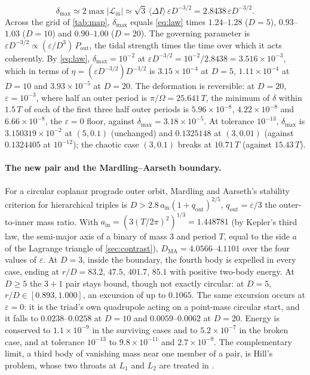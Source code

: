 \documentclass[11pt]{article}
\theoremstyle{definition}\newtheorem{definition}[theorem]{Definition}
\theoremstyle{remark}\newtheorem{remark}[theorem]{Remark}
\begin{document}
\begin{equation}\label{eq:law}
\delta_{\max}\simeq2\max|\mathcal L_{\mathrm{in}}|\simeq\sqrt3\,\langle\Delta I\rangle\,\varepsilon D^{-3/2}=2.8438\,\varepsilon D^{-3/2}.
\end{equation}
Across the grid of \cref{tab:map}, $\delta_{\max}$ equals \eqref{eq:law} times $1.24$--$1.28$ ($D=5$), $0.93$--$1.03$ ($D=10$) and $0.90$--$1.00$ ($D=20$). The governing parameter is $\varepsilon D^{-3/2}\propto(\varepsilon/D^3)\,P_{\mathrm{out}}$, the tidal strength times the time over which it acts coherently. By \eqref{eq:law}, $\delta_{\max}=10^{-2}$ at $\varepsilon D^{-3/2}=10^{-2}/2.8438=3.516\times10^{-3}$, which in terms of $\eta=(\varepsilon D^{-3/2})D^{-3/2}$ is $3.15\times10^{-4}$ at $D=5$, $1.11\times10^{-4}$ at $D=10$ and $3.93\times10^{-5}$ at $D=20$. The deformation is reversible: at $D=20$, $\varepsilon=10^{-3}$, where half an outer period is $\pi/\Omega=25.641\,T$, the minimum of $\delta$ within $1.5\,T$ of each of the first three half outer periods is $5.96\times10^{-8}$, $4.22\times10^{-8}$ and $6.66\times10^{-8}$, the $\varepsilon=0$ floor, against $\delta_{\max}=3.18\times10^{-5}$. At tolerance $10^{-13}$, $\delta_{\max}$ is $3.150319\times10^{-2}$ at $(5,0.1)$ (unchanged) and $0.1325148$ at $(3,0.01)$ (against $0.1324405$ at $10^{-12}$); the chaotic case $(3,0.1)$ breaks at $10.71\,T$ (against $15.43\,T$).

\paragraph{The new pair and the Mardling--Aarseth boundary.} For a circular coplanar prograde outer orbit, Mardling and Aarseth's stability criterion for hierarchical triples \cite{MA} is $D>2.8\,a_{\mathrm{in}}(1+q_{\mathrm{out}})^{2/5}$, $q_{\mathrm{out}}=\varepsilon/3$ the outer-to-inner mass ratio. With $a_{\mathrm{in}}=(3(T/2\pi)^2)^{1/3}=1.448781$ (by Kepler's third law, the semi-major axis of a binary of mass $3$ and period $T$, equal to the side $a$ of the Lagrange triangle of \cref{sec:contrast}), $D_{\mathrm{MA}}=4.0566$--$4.1101$ over the four values of $\varepsilon$. At $D=3$, inside the boundary, the fourth body is expelled in every case, ending at $r/D=83.2$, $47.5$, $401.7$, $85.1$ with positive two-body energy. At $D\ge5$ the $3+1$ pair stays bound, though not exactly circular: at $D=5$, $r/D\in[0.893,1.000]$, an excursion of up to $0.1065$. The same excursion occurs at $\varepsilon=0$: it is the triad's own quadrupole acting on a point-mass circular start, and it falls to $0.0238$--$0.0258$ at $D=10$ and $0.0059$--$0.0062$ at $D=20$. Energy is conserved to $1.1\times10^{-9}$ in the surviving cases and to $5.2\times10^{-7}$ in the broken case, and at tolerance $10^{-13}$ to $9.8\times10^{-11}$ and $2.7\times10^{-9}$. The complementary limit, a third body of vanishing mass near one member of a pair, is Hill's problem, whose two throats at $L_1$ and $L_2$ are treated in \cite{SPlanet}.
\end{document}

